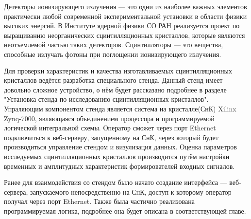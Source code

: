 Детекторы ионизирующего излучения --- это одни из наиболее важных элементов практически любой современной экспериментальной установки в области физики высоких энергий. В Институте ядерной физики СО РАН реализуется проект по выращиванию неорганических сцинтилляционных кристаллов, которые являются неотъемлемой частью таких детекторов. Сцинтилляторы --- это вещества, способные излучать фотоны при поглощении ионизирующего излучения.\par
Для проверки характеристик и качества изготавливаемых сцинтилляционных кристаллов ведётся разработка специального стенда. Данный стенд имеет довольно сложное устройство, о нём будет рассказано подробнее в разделе "Установка стенда по исследованию сцинтилляционных кристаллов". Упраляющим компонентом стенда является система на кристалле(СнК) Xilinx Zynq-7000, являющаяся объединением процессора и программируемой логической интегральной схемы. Оператор сможет через порт Ethernet подключиться к веб-серверу, запущенному на СнК, через который будет производиться управление стендом и визулизация данных. Оценка параметров исследуемых сцинтилляционных кристаллов производится путём настройки временных и амплитудных характеристик формирователей входных сигналов.\par
Ранее для взаимодействия со стендом было начато создание интерфейса --- веб-сервера, запускаемого непосредственно на СнК, доступ к которому оператор получал через порт Ethernet. Также была частично реализована программируемая логика, подробнее она будет описана в соответствующей главе.\par
